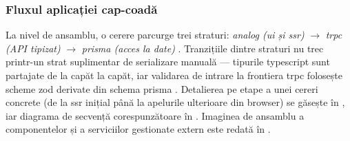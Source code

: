 \subsubsection{Fluxul aplicației cap-coadă}\label{subsec:flux-capcoada}

La nivel de ansamblu, o cerere parcurge trei straturi: \textit{\Gls{analog} (\acrshort{ui} și \acrshort{ssr})} \(\rightarrow\) \textit{\acrshort{trpc} (API tipizat)} \(\rightarrow\) \textit{\gls{prisma} (acces la date)} \cite{analog,trpc,prisma_orm}. Tranzițiile dintre straturi nu trec printr-un strat suplimentar de serializare manuală --- tipurile \gls{typescript} sunt partajate de la capăt la capăt, iar validarea de intrare la frontiera \gls{trpc} folosește scheme \gls{zod} derivate din schema \gls{prisma} \cite{trpc,zod,prisma_zod_generator}. Detalierea pe etape a unei cereri concrete (de la \acrshort{ssr} inițial până la apelurile ulterioare din browser) se găsește în , iar diagrama de secvență corespunzătoare în . Imaginea de ansamblu a componentelor și a serviciilor gestionate extern este redată în .

